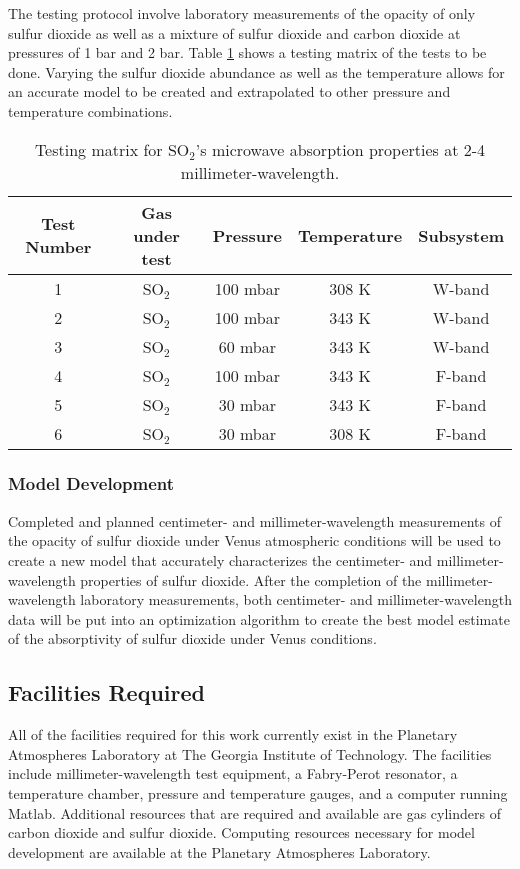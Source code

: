 The testing protocol involve laboratory measurements of the opacity of only sulfur dioxide as well as a mixture of sulfur dioxide and carbon dioxide at pressures of 1 bar and 2 bar. Table \ref{tab:testmatrix} shows a testing matrix of the tests to be done. Varying the sulfur dioxide abundance as well as the temperature allows for an accurate model to be created and extrapolated to other pressure and temperature combinations. 

\begin{table}[H]
    \centering
	\begin{tabular}{|c|c|c|c|c|}
	\hline
	Test Number & Gas under test & Pressure & Temperature & Subsystem\\
	\hline
	\hline
	1 & SO$_2$ & 100 mbar & 308 K & W-band\\
	2 & SO$_2$ & 100 mbar & 343 K & W-band\\
	3 & SO$_2$ & 60 mbar & 343 K & W-band\\
	4 & SO$_2$ & 100 mbar & 343 K & F-band\\
	5 & SO$_2$ & 30 mbar & 343 K & F-band\\
	6 & SO$_2$ & 30 mbar & 308 K & F-band\\
	\hline
	\end{tabular}
	\caption{Testing matrix for SO$_2$'s microwave absorption properties at 2-4 millimeter-wavelength.}
    \label{tab:testmatrix}
\end{table}


\subsubsection{Model Development}

Completed and planned centimeter- \cite{so2-cent-lab} \cite{so2-cent-model} and millimeter-wavelength measurements of the opacity of sulfur dioxide under Venus atmospheric conditions will be used to create a new model that accurately characterizes the centimeter- and millimeter-wavelength properties of sulfur dioxide. After the completion of the millimeter-wavelength laboratory measurements, both centimeter- and millimeter-wavelength data will be put into an optimization algorithm to create the best model estimate of the absorptivity of sulfur dioxide under Venus conditions. 

\subsection{Facilities Required}
All of the facilities required for this work currently exist in the Planetary Atmospheres Laboratory at The Georgia Institute of Technology. The facilities include millimeter-wavelength test equipment, a Fabry-Perot resonator, a temperature chamber, pressure and temperature gauges, and a computer running Matlab. Additional resources that are required and available are gas cylinders of carbon dioxide and sulfur dioxide. Computing resources necessary for model development are available at the Planetary Atmospheres Laboratory.

